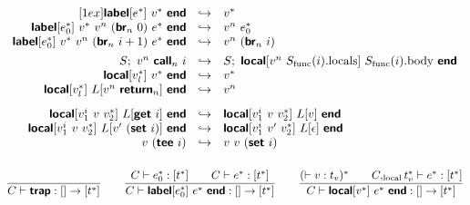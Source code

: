 \documentclass[a4paper]{scrartcl}
\newcommand\void[1]{}
\newcommand\f[1]{\ensuremath{\mathop{\mathrm{#1\null}}\nolimits}\xspace}
\newcommand\evalto{\hookrightarrow}
\newcommand\K[1]{\ensuremath{\textsf{#1}}}
\newcommand\KK[1]{\ensuremath{\K{\textbf{#1}}}}
\begin{document}
$$\begin{array}{rcl}
[1ex]
\KK{label}[e^\ast]~v^\ast~\KK{end} &\evalto&
  v^\ast \\
\KK{label}[e_0^\ast]~v^\ast~v^n~(\KK{br}_n~0)~e^\ast~\KK{end} &\evalto&
  v^n~e_0^\ast \\
\KK{label}[e_0^\ast]~v^\ast~v^n~(\KK{br}_n~i+1)~e^\ast~\KK{end} &\evalto&
  v^n~(\KK{br}_n~i) \\
[1ex]
S;~ v^n~\KK{call}_n~i &\evalto&
  S;~ \KK{local}[v^n~S_{\f{func}}(i).{\f{locals}}]~S_{\f{func}}(i).{\f{body}}~\KK{end} \\
\KK{local}[v_l^\ast]~v^\ast~\KK{end} &\evalto&
  v^\ast \\
\KK{local}[v_l^\ast]~L[v^n~\KK{return}_n]~\KK{end} &\evalto&
  v^n \\
[2ex]
\void{
S;~ (\KK{get}~i) &\evalto&
  S;~ S_{\f{local}}(i) \\
S;~ v~(\KK{set}~i) &\evalto&
  S,i=v;~ \epsilon \\
v~(\KK{tee}~i) &\evalto&
  v~v~(\KK{set}~i) \\
[1ex]
}
\KK{local}[v_1^i~v~v_2^\ast]~L[\KK{get}~i]~\KK{end} &\evalto&
  \KK{local}[v_1^i~v~v_2^\ast]~L[v]~\KK{end} \\
\KK{local}[v_1^i~v~v_2^\ast]~L[v'~(\KK{set}~i)]~\KK{end} &\evalto&
  \KK{local}[v_1^i~v'~v_2^\ast]~L[\epsilon]~\KK{end} \\
v~(\KK{tee}~i) &\evalto&
  v~v~(\KK{set}~i) \\
[1ex]
\end{array}
$$

{
$$
\frac{
}{
  C \vdash \KK{trap} : [] \to \poly{t^\ast}
}
\qquad
\frac{
  C \vdash e_0^\ast : [t^\ast]\orbot
  \qquad
  C \vdash e^\ast : [t^\ast]\orbot
}{
  C \vdash \KK{label}[e_0^\ast]~e^\ast~\KK{end} : [] \to [t^\ast]\orbot
}
\qquad
\frac{
  (\vdash v : t_v)^\ast
  \qquad
  C,_{\f{local}}t_v^\ast \vdash e^\ast : [t^\ast]\orbot
}{
  C \vdash \KK{local}[v^\ast]~e^\ast~\KK{end} : [] \to [t^\ast]\orbot
}
$$
}
\end{document}
